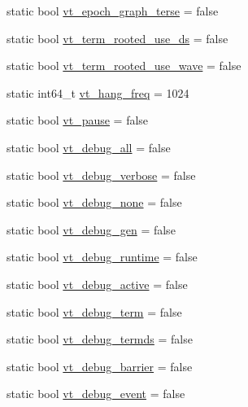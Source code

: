 \begin{DoxyCompactItemize}
\item 
static bool \hyperlink{structvt_1_1arguments_1_1_arg_config_a86447854a05bfbe2223a2e5a3561e78f}{vt\+\_\+epoch\+\_\+graph\+\_\+terse} = false
\item 
static bool \hyperlink{structvt_1_1arguments_1_1_arg_config_a7fad2709c0787c6ae775a83680ad9914}{vt\+\_\+term\+\_\+rooted\+\_\+use\+\_\+ds} = false
\item 
static bool \hyperlink{structvt_1_1arguments_1_1_arg_config_a1bd318b03ae9b5e87c2c7f2cde4a2a72}{vt\+\_\+term\+\_\+rooted\+\_\+use\+\_\+wave} = false
\item 
static int64\+\_\+t \hyperlink{structvt_1_1arguments_1_1_arg_config_a8bcbaf567f64aac567993c064179a5e5}{vt\+\_\+hang\+\_\+freq} = 1024
\item 
static bool \hyperlink{structvt_1_1arguments_1_1_arg_config_a46f31e594725bd599f66b0a0682162bc}{vt\+\_\+pause} = false
\item 
static bool \hyperlink{structvt_1_1arguments_1_1_arg_config_a2bad2770bdb9bfb9bb8f9cd6cd9ae492}{vt\+\_\+debug\+\_\+all} = false
\item 
static bool \hyperlink{structvt_1_1arguments_1_1_arg_config_ad863fc3da4d2e0e3ce0b36647da8e29b}{vt\+\_\+debug\+\_\+verbose} = false
\item 
static bool \hyperlink{structvt_1_1arguments_1_1_arg_config_ad8244f0e0ba0f2b2cbf2bc5f58acc5b0}{vt\+\_\+debug\+\_\+none} = false
\item 
static bool \hyperlink{structvt_1_1arguments_1_1_arg_config_a6c897d45359f0cae8d31f3817bbb9b60}{vt\+\_\+debug\+\_\+gen} = false
\item 
static bool \hyperlink{structvt_1_1arguments_1_1_arg_config_ae09f0220544451872310ed5188b98d9b}{vt\+\_\+debug\+\_\+runtime} = false
\item 
static bool \hyperlink{structvt_1_1arguments_1_1_arg_config_aa40cb6ebcb449382ec1da2d73855de1f}{vt\+\_\+debug\+\_\+active} = false
\item 
static bool \hyperlink{structvt_1_1arguments_1_1_arg_config_aff950c7950ea868ccc78769a9a9ccf45}{vt\+\_\+debug\+\_\+term} = false
\item 
static bool \hyperlink{structvt_1_1arguments_1_1_arg_config_abcc1685602fa86f685601ad4f65c422e}{vt\+\_\+debug\+\_\+termds} = false
\item 
static bool \hyperlink{structvt_1_1arguments_1_1_arg_config_aa521e854796aada164cd0316c48d8e23}{vt\+\_\+debug\+\_\+barrier} = false
\item 
static bool \hyperlink{structvt_1_1arguments_1_1_arg_config_a23460617fec839e7ae8d48427172b6c5}{vt\+\_\+debug\+\_\+event} = false

\end{DoxyCompactItemize}
